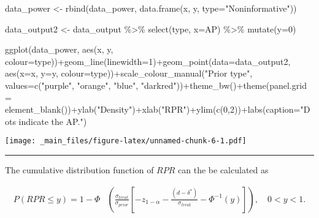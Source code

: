 \documentclass[
]{book}
\newenvironment{Shaded}{\begin{snugshade}}{\end{snugshade}}
\newcommand{\AttributeTok}[1]{\textcolor[rgb]{0.77,0.63,0.00}{#1}}
\newcommand{\DecValTok}[1]{\textcolor[rgb]{0.00,0.00,0.81}{#1}}
\newcommand{\FunctionTok}[1]{\textcolor[rgb]{0.00,0.00,0.00}{#1}}
\newcommand{\NormalTok}[1]{#1}
\newcommand{\OtherTok}[1]{\textcolor[rgb]{0.56,0.35,0.01}{#1}}
\newcommand{\SpecialCharTok}[1]{\textcolor[rgb]{0.00,0.00,0.00}{#1}}
\newcommand{\StringTok}[1]{\textcolor[rgb]{0.31,0.60,0.02}{#1}}
\begin{document}
\begin{Shaded}
\begin{Highlighting}[]
\NormalTok{data\_power }\OtherTok{\textless{}{-}} \FunctionTok{rbind}\NormalTok{(data\_power, }\FunctionTok{data.frame}\NormalTok{(x, y, }\AttributeTok{type=}\StringTok{"Noninformative"}\NormalTok{))}

\NormalTok{data\_output2 }\OtherTok{\textless{}{-}}\NormalTok{ data\_output }\SpecialCharTok{\%\textgreater{}\%} \FunctionTok{select}\NormalTok{(type, }\AttributeTok{x=}\NormalTok{AP) }\SpecialCharTok{\%\textgreater{}\%} \FunctionTok{mutate}\NormalTok{(}\AttributeTok{y=}\DecValTok{0}\NormalTok{)}

\FunctionTok{ggplot}\NormalTok{(data\_power, }\FunctionTok{aes}\NormalTok{(x, y, }\AttributeTok{colour=}\NormalTok{type))}\SpecialCharTok{+}\FunctionTok{geom\_line}\NormalTok{(}\AttributeTok{linewidth=}\DecValTok{1}\NormalTok{)}\SpecialCharTok{+}\FunctionTok{geom\_point}\NormalTok{(}\AttributeTok{data=}\NormalTok{data\_output2, }\FunctionTok{aes}\NormalTok{(}\AttributeTok{x=}\NormalTok{x, }\AttributeTok{y=}\NormalTok{y, }\AttributeTok{colour=}\NormalTok{type))}\SpecialCharTok{+}\FunctionTok{scale\_colour\_manual}\NormalTok{(}\StringTok{"Prior type"}\NormalTok{, }\AttributeTok{values=}\FunctionTok{c}\NormalTok{(}\StringTok{"purple"}\NormalTok{, }\StringTok{"orange"}\NormalTok{, }\StringTok{"blue"}\NormalTok{, }\StringTok{"darkred"}\NormalTok{))}\SpecialCharTok{+}\FunctionTok{theme\_bw}\NormalTok{()}\SpecialCharTok{+}\FunctionTok{theme}\NormalTok{(}\AttributeTok{panel.grid =} \FunctionTok{element\_blank}\NormalTok{())}\SpecialCharTok{+}\FunctionTok{ylab}\NormalTok{(}\StringTok{"Density"}\NormalTok{)}\SpecialCharTok{+}\FunctionTok{xlab}\NormalTok{(}\StringTok{"RPR"}\NormalTok{)}\SpecialCharTok{+}\FunctionTok{ylim}\NormalTok{(}\FunctionTok{c}\NormalTok{(}\DecValTok{0}\NormalTok{,}\DecValTok{2}\NormalTok{))}\SpecialCharTok{+}\FunctionTok{labs}\NormalTok{(}\AttributeTok{caption=}\StringTok{"Dots indicate the AP."}\NormalTok{)}
\end{Highlighting}
\end{Shaded}

\texttt{[image: \_main\_files/figure-latex/unnamed-chunk-6-1.pdf]}

\begin{center}\rule{0.5\linewidth}{0.5pt}\end{center}

The cumulative distribution function of \(RPR\) can the be calculated as

\[
\begin{aligned}
P(RPR\leq y)=1-\Phi&\left(\frac{\sigma_{treat}}{\sigma_{prior}}\left[-z_{1-\alpha}-\frac{(d-\delta^*)}{\sigma_{treat}}-\Phi^{-1}(y) \right]\right), \quad 0<y<1.
\end{aligned}
\]
\end{document}
